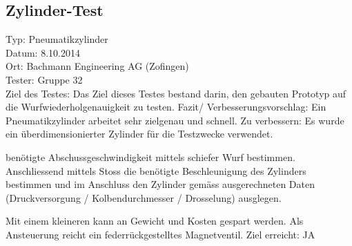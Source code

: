 \subsection{Zylinder-Test}

Typ:  Pneumatikzylinder \\
Datum:  8.10.2014     \\
Ort:  Bachmann Engineering AG (Zofingen)   \\
Tester:  Gruppe 32     \\
Ziel des Testes:   Das Ziel dieses Testes bestand darin, den gebauten Prototyp auf die 
Wurfwiederholgenauigkeit zu testen. 
Fazit/ 
Verbesserungsvorschlag: 
Ein Pneumatikzylinder arbeitet sehr zielgenau und schnell. 
Zu verbessern: 
Es wurde ein überdimensionierter Zylinder für die Testzwecke verwendet.  

\rightarrow benötigte Abschussgeschwindigkeit mittels schiefer Wurf bestimmen. 
Anschliessend mittels Stoss die benötigte Beschleunigung des Zylinders 
bestimmen und im Anschluss den Zylinder gemäss ausgerechneten Daten 
(Druckversorgung / Kolbendurchmesser / Drosselung) ausglegen. 

Mit einem kleineren kann an Gewicht und Kosten gespart werden. Als 
Ansteuerung reicht ein federrückgestelltes Magnetventil.  
Ziel erreicht:   JA